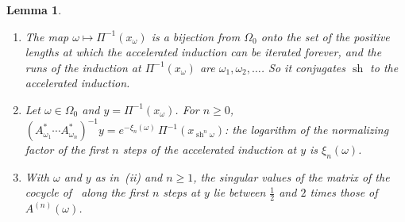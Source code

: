 \documentclass[11pt]{amsart}
\newtheorem{lemma}[proposition]{Lemma}
\theoremstyle{definition}
\theoremstyle{remark}
\begin{document}
\begin{lemma}\label{lem:dict}
\begin{enumerate}
\item[(i)] The map $\omega\mapsto\Pi^{-1}(x_\omega)$ is a bijection from $\Omega_0$ onto the set of the positive lengths at which the accelerated induction can be iterated forever, and the runs of the induction at $\Pi^{-1}(x_\omega)$ are $\omega_1,\omega_2,\dots$. So it conjugates $\operatorname{sh}$ to the accelerated induction.
\item[(ii)] Let $\omega\in\Omega_0$ and $y=\Pi^{-1}(x_\omega)$. For $n\ge0$, $(A_{\omega_1}^*\cdots A_{\omega_n}^*)^{-1}y=e^{-\xi_n(\omega)}\,\Pi^{-1}(x_{\operatorname{sh}^n\omega})$: the logarithm of the normalizing factor of the first $n$ steps of the accelerated induction at $y$ is $\xi_n(\omega)$.
\item[(iii)] With $\omega$ and $y$ as in~(ii) and $n\ge1$, the singular values of the matrix of the cocycle of~\cite{AHSinv} along the first $n$ steps at $y$ lie between $\frac12$ and $2$ times those of $A^{(n)}(\omega)$.
\end{enumerate}
\end{lemma}
\end{document}
